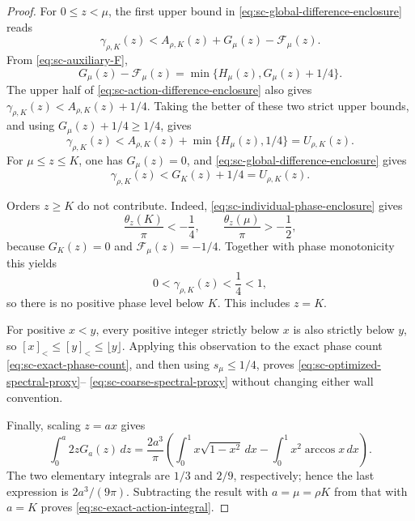 \documentclass[11pt]{article}
\numberwithin{equation}{section}
\theoremstyle{definition}
\theoremstyle{remark}
\begin{document}
\begin{proof}
For \(0\le z<\mu\), the first upper bound in
\eqref{eq:sc-global-difference-enclosure} reads
\[
  \gamma_{\rho,K}(z)
  <A_{\rho,K}(z)+G_\mu(z)-\mathcal F_\mu(z).
\]
From \eqref{eq:sc-auxiliary-F},
\[
  G_\mu(z)-\mathcal F_\mu(z)
  =\min\{H_\mu(z),G_\mu(z)+1/4\}.
\]
The upper half of \eqref{eq:sc-action-difference-enclosure} also gives
\(\gamma_{\rho,K}(z)<A_{\rho,K}(z)+1/4\).  Taking the better of these two
strict upper bounds, and using \(G_\mu(z)+1/4\ge1/4\), gives
\[
  \gamma_{\rho,K}(z)
  <A_{\rho,K}(z)+\min\{H_\mu(z),1/4\}
  =U_{\rho,K}(z).
\]
For \(\mu\le z\le K\), one has \(G_\mu(z)=0\), and
\eqref{eq:sc-global-difference-enclosure} gives
\[
  \gamma_{\rho,K}(z)<G_K(z)+1/4=U_{\rho,K}(z).
\]

Orders \(z\ge K\) do not contribute.  Indeed,
\eqref{eq:sc-individual-phase-enclosure} gives
\[
  \frac{\theta_z(K)}\pi<-\frac14,
  \qquad
  \frac{\theta_z(\mu)}\pi>-\frac12,
\]
because \(G_K(z)=0\) and \(\mathcal F_\mu(z)=-1/4\).  Together with phase
monotonicity this yields
\[
  0<\gamma_{\rho,K}(z)<\frac14<1,
\]
so there is no positive phase level below \(K\).  This includes \(z=K\).

For positive \(x<y\), every positive integer strictly below \(x\) is also
strictly below \(y\), so \([x]_<\le[y]_<\le\lfloor y\rfloor\).  Applying
this observation to the exact phase count
\eqref{eq:sc-exact-phase-count}, and then using
\(s_\mu\le1/4\), proves
\eqref{eq:sc-optimized-spectral-proxy}--
\eqref{eq:sc-coarse-spectral-proxy} without changing either wall
convention.

Finally, scaling \(z=ax\) gives
\[
  \int_0^a2zG_a(z)\,dz
  =\frac{2a^3}{\pi}
  \left(\int_0^1x\sqrt{1-x^2}\,dx
  -\int_0^1x^2\arccos x\,dx\right).
\]
The two elementary integrals are \(1/3\) and \(2/9\), respectively; hence
the last expression is \(2a^3/(9\pi)\).  Subtracting the result with
\(a=\mu=\rho K\) from that with \(a=K\) proves
\eqref{eq:sc-exact-action-integral}.
\end{proof}
\end{document}
